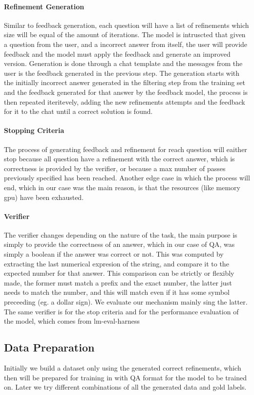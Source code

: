 \documentclass[a4paper,10pt]{article}
\begin{document}
\paragraph{Refinement Generation}
Similar to feedback generation, each question will have a list of refinements which size will be equal of the amount of iterations. The model is intruscted that given a question from the user, and a incorrect answer from itself, the user will provide feedback and the model must apply the feedback and generate an improved version. Generation is done through a chat template and the messages from the user is the feedback generated in the previous step. The generation starts with the initially incorrect answer generated in the filtering step from the training set and the feedback generated for that answer by the feedback model, the process is then repeated iteritevely, adding the new refinements  attempts and the feedback for it to the chat until a correct solution is found.
\paragraph{Stopping Criteria}
The process of generating feedback and refinement for reach question will eaither stop because all question have a refinement with the correct answer, which is correctness is provided by the verifier, or because a max number of passes previously specified has been reached. Another edge case in which the process will end, which in our case was the main reason, is that the resources (like memory gpu) have been exhausted.
\paragraph{Verifier}
The verifier changes depending on the nature of the task, the main purpose is simply to provide the correctness of an answer, which in our case of QA, was simply a boolean if the answer was correct or not. This was computed by extracting the last numerical expresion of the string, and compare it to the expected number for that answer. This comparison can be strictly or flexibly made, the former must match a prefix and the exact number, the latter just needs to match the number, and this will match even if it has some symbol preceeding (eg. a dollar sign). We evaluate our mechanism mainly sing the latter. The same verifier is for the stop criteria and for the performance evaluation of the model, which comes from lm-eval-harness


\subsection{Data Preparation}
Initially we build a dataset only using the generated correct refinements, which then will be prepared for training in with QA format for the model to be trained on. Later we try different combinations of all the generated data and gold labels.
\end{document}

